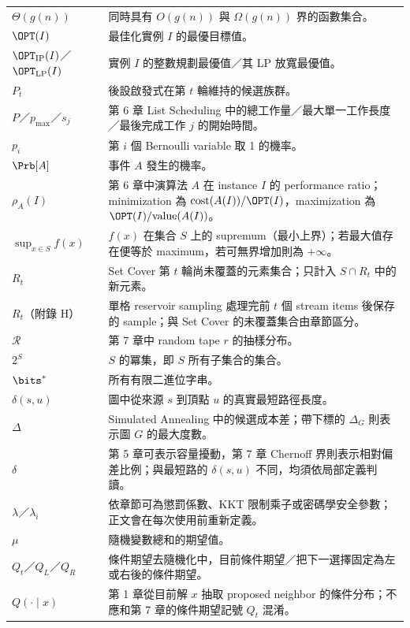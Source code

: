 \documentclass[11pt,a4paper,oneside,openany]{book}
\begin{document}
\begin{longtable}{@{}p{}p{}@{}}
$\Theta(g(n))$ & 同時具有 $O(g(n))$ 與 $\Omega(g(n))$ 界的函數集合。 \\
$\OPT(I)$ & 最佳化實例 $I$ 的最優目標值。 \\
$\OPT_{\mathrm{IP}}(I)$／$\OPT_{\mathrm{LP}}(I)$ & 實例 $I$ 的整數規劃最優值／其 LP 放寬最優值。 \\
$P_t$ & 後設啟發式在第 $t$ 輪維持的候選族群。 \\
$P$／$p_{\max}$／$s_j$ & 第 6 章 List Scheduling 中的總工作量／最大單一工作長度／最後完成工作 $j$ 的開始時間。 \\
$p_i$ & 第 $i$ 個 Bernoulli variable 取 1 的機率。 \\
$\Prb[A]$ & 事件 $A$ 發生的機率。 \\
$\rho_A(I)$ & 第 6 章中演算法 $A$ 在 instance $I$ 的 performance ratio；minimization 為 $\mathrm{cost}(A(I))/\OPT(I)$，maximization 為 $\OPT(I)/\mathrm{value}(A(I))$。 \\
$\sup_{x\in S}f(x)$ & $f(x)$ 在集合 $S$ 上的 supremum（最小上界）；若最大值存在便等於 maximum，若可無界增加則為 $+\infty$。 \\
$R_t$ & Set Cover 第 $t$ 輪尚未覆蓋的元素集合；只計入 $S\cap R_t$ 中的新元素。 \\
$R_t$（附錄 H） & 單格 reservoir sampling 處理完前 $t$ 個 stream items 後保存的 sample；與 Set Cover 的未覆蓋集合由章節區分。 \\
$\mathcal R$ & 第 7 章中 random tape $r$ 的抽樣分布。 \\
$2^S$ & $S$ 的冪集，即 $S$ 所有子集合的集合。 \\
$\bits^*$ & 所有有限二進位字串。 \\
$\delta(s,u)$ & 圖中從來源 $s$ 到頂點 $u$ 的真實最短路徑長度。 \\
$\Delta$ & Simulated Annealing 中的候選成本差；帶下標的 $\Delta_G$ 則表示圖 $G$ 的最大度數。 \\
$\delta$ & 第 5 章可表示容量擾動，第 7 章 Chernoff 界則表示相對偏差比例；與最短路的 $\delta(s,u)$ 不同，均須依局部定義判讀。 \\
$\lambda$／$\lambda_i$ & 依章節可為懲罰係數、KKT 限制乘子或密碼學安全參數；正文會在每次使用前重新定義。 \\
$\mu$ & 隨機變數總和的期望值。 \\
$Q_t$／$Q_L$／$Q_R$ & 條件期望去隨機化中，目前條件期望／把下一選擇固定為左或右後的條件期望。 \\
$Q(\cdot\mid x)$ & 第 1 章從目前解 $x$ 抽取 proposed neighbor 的條件分布；不應和第 7 章的條件期望記號 $Q_t$ 混淆。 \\

\end{longtable}
\end{document}
